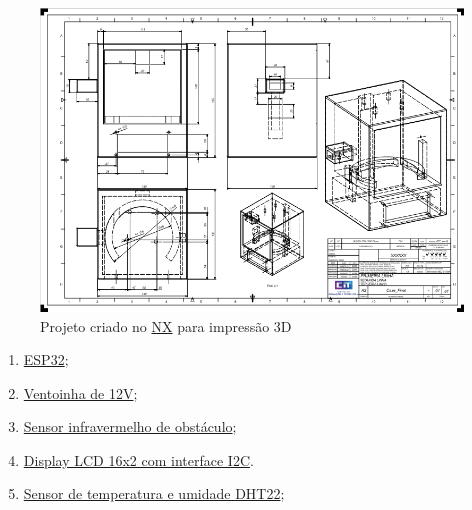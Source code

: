 \documentclass{article}
\begin{document}
\begin{figure}[ht!]
\centering
\includegraphics[width=\textwidth]{nx.png}
\caption{Projeto criado no \href{https://plm.sw.siemens.com/en-US/nx/}{NX} para impressão 3D}
\end{figure}
\begin{enumerate}
\item \href{https://www.eletrogate.com/placa-wemos-d1-esp32-wifi-bluetooth}{ESP32};
\item \href{https://www.eletrogate.com/cooler-ventoinha-radial-5015-12v}{Ventoinha de 12V};
\item \href{https://www.eletrogate.com/sensor-de-obstaculo-reflexivo-infravermelho}{Sensor infravermelho de obstáculo};
\item \href{https://www.eletrogate.com/display-lcd-16x2-com-backlight-azul}{Display LCD 16x2 com interface I2C}.
\item \href{https://www.eletrogate.com/sensor-de-umidade-e-temperatura-dht11}{Sensor de temperatura e umidade DHT22};
\end{enumerate}
\end{document}
